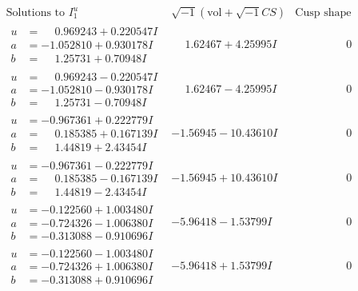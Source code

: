\documentclass[1p]{elsarticle_modified}
\theoremstyle{definition}
\newcommand{\I}{\sqrt{-1}}
\begin{document}
$$\begin{array}{c|c|c}  
\text{Solutions to }I^u_{1}& \I (\text{vol} + \sqrt{-1}CS) & \text{Cusp shape}\\
 \hline 
\begin{aligned}
u &= \phantom{-}0.969243 + 0.220547 I \\
a &= -1.052810 + 0.930178 I \\
b &= \phantom{-}1.25731 + 0.70948 I\end{aligned}
 & \phantom{-}1.62467 + 4.25995 I & \phantom{-0.000000 } 0 \\ \hline\begin{aligned}
u &= \phantom{-}0.969243 - 0.220547 I \\
a &= -1.052810 - 0.930178 I \\
b &= \phantom{-}1.25731 - 0.70948 I\end{aligned}
 & \phantom{-}1.62467 - 4.25995 I & \phantom{-0.000000 } 0 \\ \hline\begin{aligned}
u &= -0.967361 + 0.222779 I \\
a &= \phantom{-}0.185385 + 0.167139 I \\
b &= \phantom{-}1.44819 + 2.43454 I\end{aligned}
 & -1.56945 - 10.43610 I & \phantom{-0.000000 } 0 \\ \hline\begin{aligned}
u &= -0.967361 - 0.222779 I \\
a &= \phantom{-}0.185385 - 0.167139 I \\
b &= \phantom{-}1.44819 - 2.43454 I\end{aligned}
 & -1.56945 + 10.43610 I & \phantom{-0.000000 } 0 \\ \hline\begin{aligned}
u &= -0.122560 + 1.003480 I \\
a &= -0.724326 - 1.006380 I \\
b &= -0.313088 - 0.910696 I\end{aligned}
 & -5.96418 - 1.53799 I & \phantom{-0.000000 } 0 \\ \hline\begin{aligned}
u &= -0.122560 - 1.003480 I \\
a &= -0.724326 + 1.006380 I \\
b &= -0.313088 + 0.910696 I\end{aligned}
 & -5.96418 + 1.53799 I & \phantom{-0.000000 } 0 \\ \hline\begin{aligned}

\end{aligned}
\end{array}$$
\end{document}
